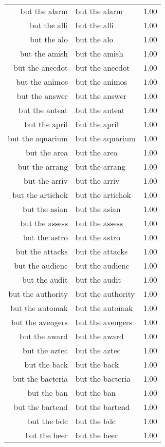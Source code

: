 \begin{table}[ht]
\begin{tabular}{rlr}
  but the alarm & but the alarm & 1.00 \\ 
  but the alli & but the alli & 1.00 \\ 
  but the alo & but the alo & 1.00 \\ 
  but the amish & but the amish & 1.00 \\ 
  but the anecdot & but the anecdot & 1.00 \\ 
  but the animos & but the animos & 1.00 \\ 
  but the answer & but the answer & 1.00 \\ 
  but the anteat & but the anteat & 1.00 \\ 
  but the april & but the april & 1.00 \\ 
  but the aquarium & but the aquarium & 1.00 \\ 
  but the area & but the area & 1.00 \\ 
  but the arrang & but the arrang & 1.00 \\ 
  but the arriv & but the arriv & 1.00 \\ 
  but the artichok & but the artichok & 1.00 \\ 
  but the asian & but the asian & 1.00 \\ 
  but the assess & but the assess & 1.00 \\ 
  but the astro & but the astro & 1.00 \\ 
  but the attacks & but the attacks & 1.00 \\ 
  but the audienc & but the audienc & 1.00 \\ 
  but the audit & but the audit & 1.00 \\ 
  but the authority & but the authority & 1.00 \\ 
  but the automak & but the automak & 1.00 \\ 
  but the avengers & but the avengers & 1.00 \\ 
  but the award & but the award & 1.00 \\ 
  but the aztec & but the aztec & 1.00 \\ 
  but the back & but the back & 1.00 \\ 
  but the bacteria & but the bacteria & 1.00 \\ 
  but the ban & but the ban & 1.00 \\ 
  but the bartend & but the bartend & 1.00 \\ 
  but the bdc & but the bdc & 1.00 \\ 
  but the beer & but the beer & 1.00 \\ 

\end{tabular}
\end{table}
